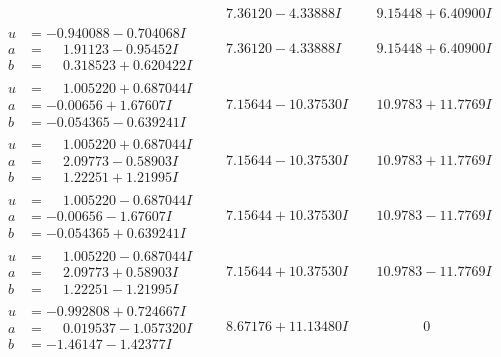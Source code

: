 \documentclass[1p]{elsarticle_modified}
\theoremstyle{definition}
\begin{document}
$$\begin{array}{c|c|c}
 & \phantom{-}7.36120 - 4.33888 I & \phantom{-}9.15448 + 6.40900 I \\ \hline\begin{aligned}
u &= -0.940088 - 0.704068 I \\
a &= \phantom{-}1.91123 - 0.95452 I \\
b &= \phantom{-}0.318523 + 0.620422 I\end{aligned}
 & \phantom{-}7.36120 - 4.33888 I & \phantom{-}9.15448 + 6.40900 I \\ \hline\begin{aligned}
u &= \phantom{-}1.005220 + 0.687044 I \\
a &= -0.00656 + 1.67607 I \\
b &= -0.054365 - 0.639241 I\end{aligned}
 & \phantom{-}7.15644 - 10.37530 I & \phantom{-}10.9783 + 11.7769 I \\ \hline\begin{aligned}
u &= \phantom{-}1.005220 + 0.687044 I \\
a &= \phantom{-}2.09773 - 0.58903 I \\
b &= \phantom{-}1.22251 + 1.21995 I\end{aligned}
 & \phantom{-}7.15644 - 10.37530 I & \phantom{-}10.9783 + 11.7769 I \\ \hline\begin{aligned}
u &= \phantom{-}1.005220 - 0.687044 I \\
a &= -0.00656 - 1.67607 I \\
b &= -0.054365 + 0.639241 I\end{aligned}
 & \phantom{-}7.15644 + 10.37530 I & \phantom{-}10.9783 - 11.7769 I \\ \hline\begin{aligned}
u &= \phantom{-}1.005220 - 0.687044 I \\
a &= \phantom{-}2.09773 + 0.58903 I \\
b &= \phantom{-}1.22251 - 1.21995 I\end{aligned}
 & \phantom{-}7.15644 + 10.37530 I & \phantom{-}10.9783 - 11.7769 I \\ \hline\begin{aligned}
u &= -0.992808 + 0.724667 I \\
a &= \phantom{-}0.019537 - 1.057320 I \\
b &= -1.46147 - 1.42377 I\end{aligned}
 & \phantom{-}8.67176 + 11.13480 I & \phantom{-0.000000 } 0 \\ \hline\begin{aligned}

\end{aligned}
\end{array}$$
\end{document}
